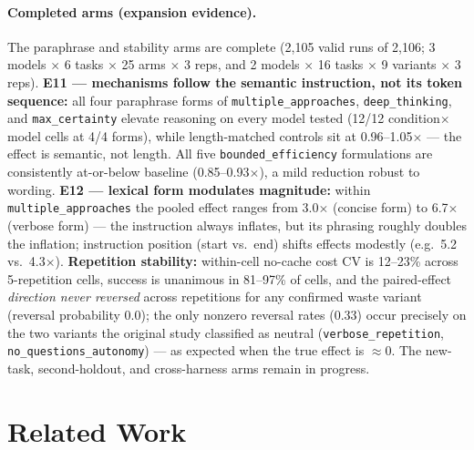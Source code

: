 \documentclass[11pt]{article}
\newcommand{\xd}{$\times$}
\begin{document}
\paragraph{Completed arms (expansion evidence).} The paraphrase and
stability arms are complete (2{,}105 valid runs of 2{,}106; 3 models
$\times$ 6 tasks $\times$ 25 arms $\times$ 3 reps, and 2 models $\times$ 16
tasks $\times$ 9 variants $\times$ 3 reps). \textbf{E11 --- mechanisms
follow the semantic instruction, not its token sequence:} all four
paraphrase forms of \texttt{multiple\_approaches}, \texttt{deep\_thinking},
and \texttt{max\_certainty} elevate reasoning on every model tested (12/12
condition$\times$model cells at 4/4 forms), while length-matched controls
sit at 0.96--1.05\xd{} --- the effect is semantic, not length. All five
\texttt{bounded\_efficiency} formulations are consistently at-or-below
baseline (0.85--0.93\xd), a mild reduction robust to wording.
\textbf{E12 --- lexical form modulates magnitude:} within
\texttt{multiple\_approaches} the pooled effect ranges from 3.0\xd{}
(concise form) to 6.7\xd{} (verbose form) --- the instruction always
inflates, but its phrasing roughly doubles the inflation; instruction
position (start vs.\ end) shifts effects modestly (e.g.\ 5.2 vs.\ 4.3\xd).
\textbf{Repetition stability:} within-cell no-cache cost CV is 12--23\%
across 5-repetition cells, success is unanimous in 81--97\% of cells, and
the paired-effect \emph{direction never reversed} across repetitions for
any confirmed waste variant (reversal probability 0.0); the only nonzero
reversal rates (0.33) occur precisely on the two variants the original
study classified as neutral (\texttt{verbose\_repetition},
\texttt{no\_questions\_autonomy}) --- as expected when the true effect is
$\approx$0. The new-task, second-holdout, and cross-harness arms remain in
progress.

\section{Related Work}
\end{document}
